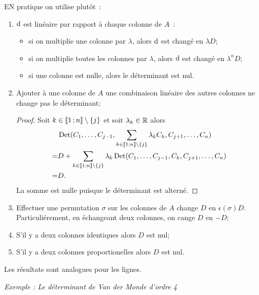 EN pratique on utilise plutôt~:
\begin{enumerate}
\item \(\mathrm{d}\) est linéaire par rapport à chaque colonne de \(A\)~:
  \begin{itemize}
  \item si on multiplie une colonne par \(\lambda\), alors \(\mathrm{d}\) est changé en \(\lambda D\);
  \item si on multiplie toutes les colonnes par \(\lambda\), alors \(\mathrm{d}\) est changé en \(\lambda^n D\);
  \item si une colonne est nulle, alors le déterminant est nul.
  \end{itemize}
\item Ajouter à une colonne de \(A\) une combinaison linéaire des autres colonnes ne change pas le déterminant;

\begin{proof}
  Soit \(k \in \mathopen{\llbracket}1\mathclose{}\mathpunct{};n\mathclose{\rrbracket}\setminus\{j\}\) et soit \(\lambda_k \in \mathbb{R}\) alors
  \begin{align}
    &\operatorname{Det}(C_1, \ldots, C_{j-1}, \sum_{k \in \mathopen{\llbracket}1\mathclose{}\mathpunct{};n\mathclose{\rrbracket}\setminus\{j\}}\lambda_kC_k, C_{j+1}, \ldots, C_n) \\
    =&D + \sum_{k \in \mathopen{\llbracket}1\mathclose{}\mathpunct{};n\mathclose{\rrbracket}\setminus\{j\}}\lambda_k \operatorname{Det}(C_1, \ldots, C_{j-1}, C_k, C_{j+1}, \ldots, C_n) \\
    =&D.
  \end{align}
  La somme est nulle puisque le déterminant est alterné.
\end{proof}
\item Effectuer une permutation \(\sigma\) sur les colonnes de \(A\) change \(D\) en \(\epsilon(\sigma)D\). Particuliérement, en échangeant deux colonnes, on cange \(D\) en \(-D\);
\item S'il y a deux colonnes identiques alors \(D\) est nul;
\item S'il y a deux colonnes proportionelles alors \(D\) est nul.
\end{enumerate}
Les résultats sont analogues pour les lignes.

\emph{Exemple : Le déterminant de Van der Monde d'ordre 4}

